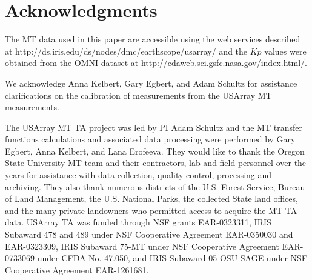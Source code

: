 \documentclass[linenumbers,draft]{agujournal}
\begin{document}
\section{Acknowledgments}

The MT data used in this paper are accessible using the web services described at http://ds.iris.edu/ds/nodes/dmc/earthscope/usarray/ and the $Kp$ values were obtained from the OMNI dataset at http://cdaweb.sci.gsfc.nasa.gov/index.html/.

We acknowledge Anna Kelbert, Gary Egbert, and Adam Schultz for assistance clarifications on the calibration of measurements from the USArray MT measurements.

The USArray MT TA project was led by PI Adam Schultz and the MT transfer functions calculations and associated data processing were performed by Gary Egbert, Anna Kelbert, and Lana Erofeeva.  They would like to thank the Oregon State University MT team and their contractors, lab and field personnel over the years for assistance with data collection, quality control, processing and archiving. They also thank numerous districts of the U.S. Forest Service, Bureau of Land Management, the U.S. National Parks, the collected State land offices, and the many private landowners who permitted access to acquire the MT TA data. USArray TA was funded through NSF grants EAR-0323311, IRIS Subaward 478 and 489 under NSF Cooperative Agreement EAR-0350030 and EAR-0323309, IRIS Subaward 75-MT under NSF Cooperative Agreement EAR-0733069 under CFDA No. 47.050, and IRIS Subaward 05-OSU-SAGE under NSF Cooperative Agreement EAR-1261681.

\clearpage

%
%
\end{document}

